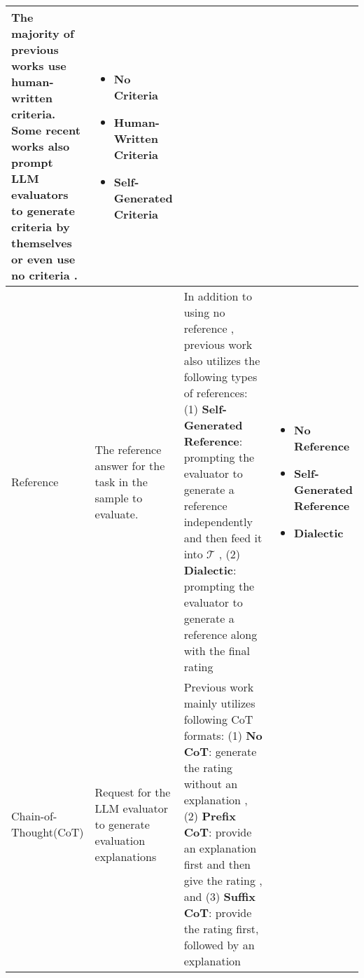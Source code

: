 \begin{table*} [t]
{\begin{tabular}{p{0.09\linewidth}p{0.24\linewidth}p{0.44\linewidth}p{0.23\linewidth}}
The majority of previous works use human-written criteria. Some recent works also prompt LLM evaluators to generate criteria by themselves \cite{kotonya-etal-2023-little} or even use no criteria \cite{murugadoss2024evaluating}. 
&  \begin{minipage}[t]{\linewidth}\vspace{-7pt}\begin{itemize}[itemsep=0.5pt, topsep=0pt, left=0pt]
    \item \textbf{No Criteria}
    \item \textbf{Human-Written Criteria}
    \item \textbf{Self-Generated Criteria}
\end{itemize}\vspace{-7pt}\end{minipage} \\
\midrule
Reference & The reference answer for the task in the sample to evaluate. & 
In addition to using no reference \cite{liu-etal-2023-g}, previous work also utilizes the following types of references: 
(1) \textbf{Self-Generated Reference}: prompting the evaluator to generate a reference independently and then feed it into $ \mathcal{T} $ \cite{zeng2024llmbar}, 
(2) \textbf{Dialectic}: prompting the evaluator to generate a reference along with the final rating \cite{he-etal-2024-socreval}
 & \begin{minipage}[t]{\linewidth}\vspace{-7pt}\begin{itemize}[itemsep=0.5pt, topsep=0pt, left=0pt]
     \item \textbf{No Reference}
     \item \textbf{Self-Generated Reference}
     \item \textbf{Dialectic}
\end{itemize}\vspace{0pt}\end{minipage} 
\\
\midrule
 Chain-of-Thought\newline(CoT) & Request for the LLM evaluator to generate evaluation explanations & Previous work mainly utilizes following CoT formats: (1) \textbf{No CoT}: generate the rating without an explanation \cite{liu-etal-2023-g}, (2) \textbf{Prefix CoT}: provide an explanation first and then give the rating \cite{zheng2023judging, chiang-lee-2023-closer}, and (3) \textbf{Suffix CoT}: provide the rating first, followed by an explanation \cite{chiang-lee-2023-closer} & \begin{minipage}[t]{\linewidth}\vspace{-7pt}\begin{itemize}[itemsep=0.5pt, topsep=0pt, left=0pt]

\end{itemize}
\end{minipage}
\end{tabular}}
\end{table*}
